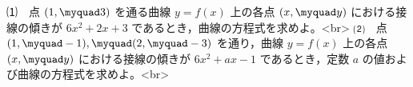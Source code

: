 ⑴　点 $(1,\myquad 3)$ を通る曲線 $y=f(x)$ 上の各点 $(x,\myquad y)$ における接線の傾きが $6x^2+2x+3$ であるとき，曲線の方程式を求めよ。<br>
⑵　点 $(1,\myquad -1),\myquad (2,\myquad -3)$ を通り，曲線 $y=f(x)$ 上の各点 $(x,\myquad y)$ における接線の傾きが $6x^2+ax-1$ であるとき，定数 $a$ の値および曲線の方程式を求めよ。<br>
